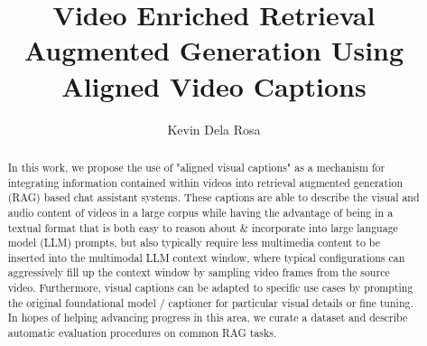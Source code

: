 \documentclass[sigconf]{acmart}
\begin{document}
	
	\title{Video Enriched Retrieval Augmented Generation Using Aligned Video Captions}
	
	\author{Kevin Dela Rosa}
	
	
	\begin{abstract}
		In this work, we propose the use of "aligned visual captions" as a mechanism for integrating information contained within videos into retrieval augmented generation (RAG) based chat assistant systems. These captions are able to describe the visual and audio content of videos in a large corpus while having the advantage of being in a textual format that is both easy to reason about \& incorporate into large language model (LLM) prompts, but also typically require less multimedia content to be inserted into the multimodal LLM context window, where typical configurations can aggressively fill up the context window by sampling video frames from the source video. Furthermore, visual captions can be adapted to specific use cases by prompting the original foundational model / captioner for particular visual details or fine tuning. In hopes of helping advancing progress in this area, we curate a dataset and describe automatic evaluation procedures on common RAG tasks.
	\end{abstract}
	
\end{document}
